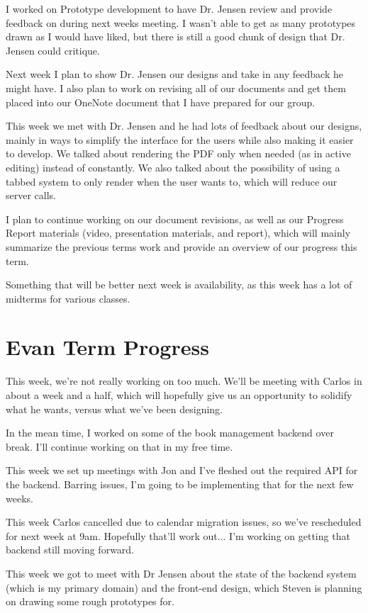 \documentclass[onecolumn, draftclsnofoot,10pt, compsoc]{IEEEtran}
\begin{document}
I worked on Prototype development to have Dr. Jensen review and provide 
feedback on during next weeks meeting. I wasn't able to get as many prototypes 
drawn as I would have liked, but there is still a good chunk of design that 
Dr. Jensen could critique.

Next week I plan to show Dr. Jensen our designs and take in any feedback he 
might have. I also plan to work on revising all of our documents and get them 
placed into our OneNote document that I have prepared for our group.


This week we met with Dr. Jensen and he had lots of feedback about our designs, 
mainly in ways to simplify the interface for the users while also making it 
easier to develop. We talked about rendering the PDF only when needed 
(as in active editing) instead of constantly. We also talked about the 
possibility of using a tabbed system to only render when the user wants to, 
which will reduce our server calls.

I plan to continue working on our document revisions, as well as our Progress 
Report materials (video, presentation materials, and report), which will mainly 
summarize the previous terms work and provide an overview of our progress 
this term.

Something that will be better next week is availability, as this week has a 
lot of midterms for various classes.


\section{Evan Term Progress}

This week, we're not really working on too much. We'll be meeting with Carlos 
in about a week and a half, which will hopefully give us an opportunity to 
solidify what he wants, versus what we've been designing.

In the mean time, I worked on some of the book management backend over break. 
I'll continue working on that in my free time.


This week we set up meetings with Jon and I've fleshed out the required API 
for the backend. Barring issues, I'm going to be implementing that for the 
next few weeks.

This week Carlos cancelled due to calendar migration issues, so we've 
rescheduled for next week at 9am. Hopefully that'll work out...
I'm working on getting that backend still moving forward. 

This week we got to meet with Dr Jensen about the state of the backend system 
(which is my primary domain) and the front-end design, which Steven is planning 
on drawing some rough prototypes for.
\end{document}
